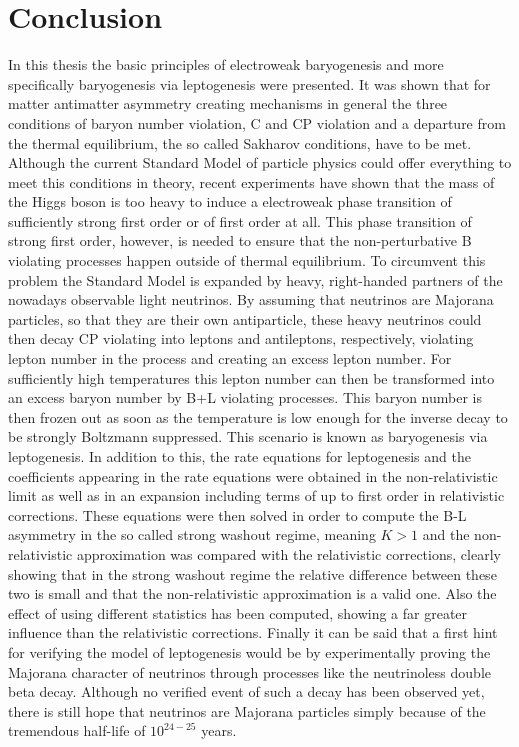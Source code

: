 \chapter{Conclusion}
In this thesis the basic principles of electroweak baryogenesis and more specifically baryogenesis via leptogenesis were presented. It was shown that for matter antimatter asymmetry creating mechanisms in general the three conditions of baryon number violation, C and CP violation and a departure from the thermal equilibrium, the so called Sakharov conditions, have to be met. \newline \indent
Although the current Standard Model of particle physics could offer everything to meet this conditions in theory, recent experiments have shown that the mass of the Higgs boson is too heavy to induce a electroweak phase transition of sufficiently strong first order or of first order at all. This phase transition of strong first order, however, is needed to ensure that the non-perturbative B violating processes happen outside of thermal equilibrium. \newline \indent
To circumvent this problem the Standard Model is expanded by heavy, right-handed partners of the nowadays observable light neutrinos. By assuming that neutrinos are Majorana particles, so that they are their own antiparticle, these heavy neutrinos could then decay CP violating into leptons and antileptons, respectively, violating lepton number in the process and creating an excess lepton number. For sufficiently high temperatures this lepton number can then be transformed into an excess baryon number by B+L violating processes. This baryon number is then frozen out as soon as the temperature is low enough for the inverse decay to be strongly Boltzmann suppressed. This scenario is known as baryogenesis via leptogenesis. \newline \indent
In addition to this, the rate equations for leptogenesis and the coefficients appearing in the rate equations were obtained in the non-relativistic limit as well as in an expansion including terms of up to first order in relativistic corrections. These equations were then solved in order to compute the B-L asymmetry in the so called strong washout regime, meaning $K>1$ and the non-relativistic approximation was compared with the relativistic corrections, clearly showing that in the strong washout regime the relative difference between these two is small and that the non-relativistic approximation is a valid one. Also the effect of using different statistics has been computed, showing a far greater influence than the relativistic corrections.  \newline \indent
Finally it can be said that a first hint for verifying the model of leptogenesis would be by experimentally proving the Majorana character of neutrinos through processes like the neutrinoless double beta decay. Although no verified event of such a decay has been observed yet, there is still hope that neutrinos are Majorana particles simply because of the tremendous half-life of $10^{24-25}$ years\cite{Arnold:2016ezh}.

